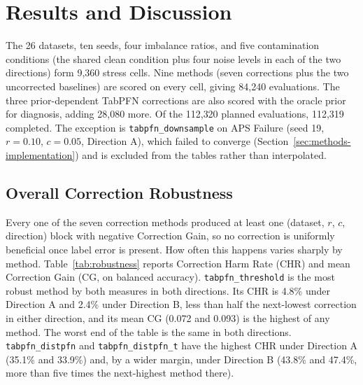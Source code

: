 \section{Results and Discussion}
\label{sec:results}

The 26 datasets, ten seeds, four imbalance ratios, and five contamination
conditions (the shared clean condition plus four noise levels in each of the two
directions) form 9{,}360 stress cells. Nine methods (seven corrections plus the
two uncorrected baselines) are scored on every cell, giving 84{,}240 evaluations.
The three prior-dependent TabPFN corrections are also scored with the oracle
prior for diagnosis, adding 28{,}080 more. Of the 112{,}320 planned evaluations,
112{,}319 completed. The exception is \texttt{tabpfn\_downsample} on APS Failure
(seed 19, $r{=}0.10$, $c{=}0.05$, Direction A), which failed to converge
(Section~\ref{sec:methods-implementation}) and is excluded from the tables rather
than interpolated.

\subsection{Overall Correction Robustness}
\label{sec:results-rq1}

Every one of the seven correction methods produced at least one (dataset, $r$,
$c$, direction) block with negative Correction Gain, so no correction is
uniformly beneficial once label error is present. How often this happens varies
sharply by method. Table~\ref{tab:robustness} reports Correction Harm Rate (CHR)
and mean Correction Gain (CG, on balanced accuracy). \texttt{tabpfn\_threshold}
is the most robust method by both measures in both directions. Its CHR is 4.8\%
under Direction A and 2.4\% under Direction B, less than half the next-lowest
correction in either direction, and its mean CG (0.072 and 0.093) is the highest
of any method. The worst end of the table is the same in both directions.
\texttt{tabpfn\_distpfn} and \texttt{tabpfn\_distpfn\_t} have the highest CHR
under Direction A (35.1\% and 33.9\%) and, by a wider margin, under Direction B
(43.8\% and 47.4\%, more than five times the next-highest method there).

